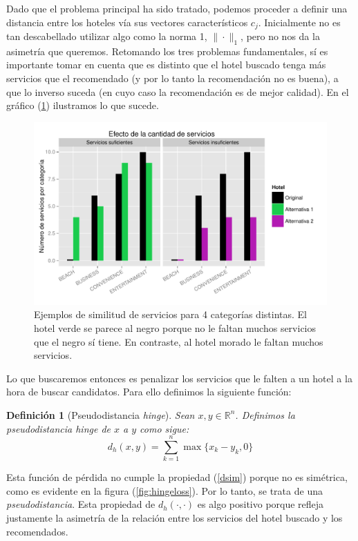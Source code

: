 \documentclass[12pt]{report}
\newtheorem{defn}{Definici\'on}[chapter]
\begin{document}
Dado que el problema principal ha sido tratado, podemos proceder a definir una distancia entre los hoteles vía sus vectores característicos $c_j$. Inicialmente no es tan descabellado utilizar algo como la norma 1, $\| \cdot \|_1$, pero no nos da la asimetría que queremos. Retomando los tres problemas fundamentales, sí es importante tomar en cuenta que es distinto que el hotel buscado tenga más servicios que el recomendado (y por lo tanto la recomendación no es buena), a que lo inverso suceda (en cuyo caso la recomendación es de mejor calidad). En el gráfico (\ref*{simserv}) ilustramos lo que sucede.
\begin{figure}[ht]
	\centering
	\includegraphics[width=\textwidth]{imagenes/simserv.pdf}
	\caption{\label{simserv} Ejemplos de similitud de servicios para 4 categorías distintas. El hotel verde se parece al negro porque no le faltan muchos servicios que el negro sí tiene. En contraste, al hotel morado le faltan muchos servicios.}
\end{figure}
Lo que buscaremos entonces es penalizar los servicios que le falten a un hotel a la hora de buscar candidatos. Para ello definimos la siguiente función:
\begin{defn}[Pseudodistancia \emph{hinge}]
Sean $x, y \in \mathbb{R}^n$. Definimos la pseudodistancia \emph{hinge} de $x$ a $y$ como sigue:
\[
d_h(x,y) = \sum_{k=1}^n \max\{x_k - y_k, 0\}
\]
\end{defn}
Esta función de pérdida no cumple la propiedad (\ref{dsim}) porque no es simétrica, como es evidente en la figura (\ref{fig:hingeloss}). Por lo tanto, se trata de una \emph{pseudodistancia}. Esta propiedad de $d_h(\cdot, \cdot)$ es algo positivo porque refleja justamente la asimetría de la relación entre los servicios del hotel buscado y los recomendados.
\end{document}
